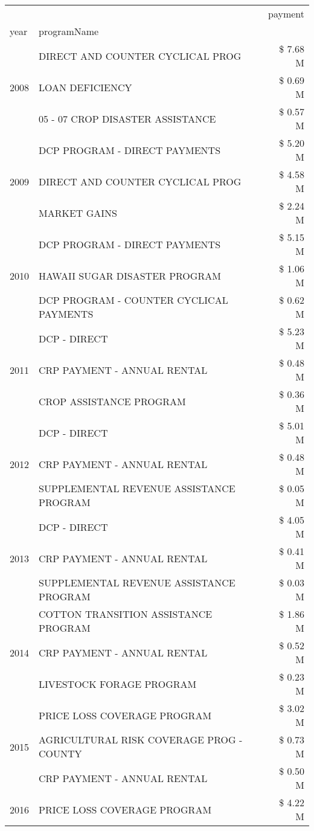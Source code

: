 \begin{tabular}{llr}
\toprule
 &  & payment \\
year & programName &  \\
\midrule
\multirow[t]{3}{*}{2008} & DIRECT AND COUNTER CYCLICAL PROG & \$ 7.68 M \\
 & LOAN DEFICIENCY & \$ 0.69 M \\
 & 05 - 07 CROP DISASTER ASSISTANCE & \$ 0.57 M \\
\cline{1-3}
\multirow[t]{3}{*}{2009} & DCP PROGRAM - DIRECT PAYMENTS & \$ 5.20 M \\
 & DIRECT AND COUNTER CYCLICAL PROG & \$ 4.58 M \\
 & MARKET GAINS & \$ 2.24 M \\
\cline{1-3}
\multirow[t]{3}{*}{2010} & DCP PROGRAM - DIRECT PAYMENTS & \$ 5.15 M \\
 & HAWAII SUGAR DISASTER PROGRAM & \$ 1.06 M \\
 & DCP PROGRAM - COUNTER CYCLICAL PAYMENTS & \$ 0.62 M \\
\cline{1-3}
\multirow[t]{3}{*}{2011} & DCP - DIRECT & \$ 5.23 M \\
 & CRP PAYMENT - ANNUAL RENTAL & \$ 0.48 M \\
 & CROP ASSISTANCE PROGRAM & \$ 0.36 M \\
\cline{1-3}
\multirow[t]{3}{*}{2012} & DCP - DIRECT & \$ 5.01 M \\
 & CRP PAYMENT - ANNUAL RENTAL & \$ 0.48 M \\
 & SUPPLEMENTAL REVENUE ASSISTANCE PROGRAM & \$ 0.05 M \\
\cline{1-3}
\multirow[t]{3}{*}{2013} & DCP - DIRECT & \$ 4.05 M \\
 & CRP PAYMENT - ANNUAL RENTAL & \$ 0.41 M \\
 & SUPPLEMENTAL REVENUE ASSISTANCE PROGRAM & \$ 0.03 M \\
\cline{1-3}
\multirow[t]{3}{*}{2014} & COTTON TRANSITION ASSISTANCE PROGRAM & \$ 1.86 M \\
 & CRP PAYMENT - ANNUAL RENTAL & \$ 0.52 M \\
 & LIVESTOCK FORAGE PROGRAM & \$ 0.23 M \\
\cline{1-3}
\multirow[t]{3}{*}{2015} & PRICE LOSS COVERAGE PROGRAM & \$ 3.02 M \\
 & AGRICULTURAL RISK COVERAGE PROG - COUNTY & \$ 0.73 M \\
 & CRP PAYMENT - ANNUAL RENTAL & \$ 0.50 M \\
\cline{1-3}
\multirow[t]{3}{*}{2016} & PRICE LOSS COVERAGE PROGRAM                   & \$ 4.22 M \\

\end{tabular}
